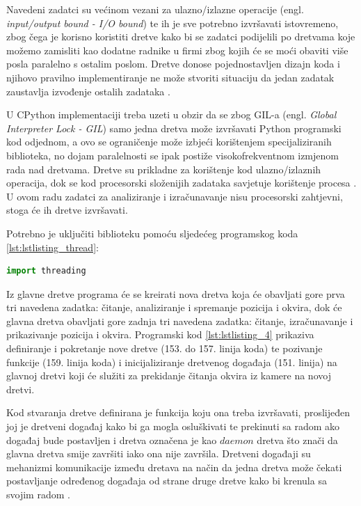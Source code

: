 \documentclass{foi}
\begin{document}
\justifying

Navedeni zadatci su većinom vezani za ulazno/izlazne operacije (engl. \emph{input/output bound - I/O bound}) te ih je sve potrebno izvršavati istovremeno, zbog čega je korisno koristiti dretve kako bi se zadatci podijelili po dretvama koje možemo zamisliti kao dodatne radnike u firmi zbog kojih će se moći obaviti više posla paralelno s ostalim poslom. Dretve donose pojednostavljen dizajn koda i njihovo pravilno implementiranje ne može stvoriti situaciju da jedan zadatak zaustavlja izvođenje ostalih zadataka \cite{AndersonJim}.

U CPython implementaciji treba uzeti u obzir da se zbog GIL-a (engl. \emph{Global Interpreter Lock - GIL}) samo jedna dretva može izvršavati Python programski kod odjednom, a ovo se ograničenje može izbjeći korištenjem specijaliziranih biblioteka, no dojam paralelnosti se ipak postiže visokofrekventnom izmjenom rada nad dretvama. Dretve su prikladne za korištenje kod ulazno/izlaznih operacija, dok se kod procesorski složenijih zadataka savjetuje korištenje procesa \cite{PythonSoftwareFoundation2}. U ovom radu zadatci za analiziranje i izračunavanje nisu procesorski zahtjevni, stoga će ih dretve izvršavati.

\flushleft Potrebno je uključiti biblioteku pomoću sljedećeg programskog koda \ref{lst:lstlisting_thread}:
\begin{lstlisting}[language=Python, label={lst:lstlisting_thread}, firstnumber=2, style=colored, caption=Uključivanje biblioteke $threading$]
import threading
\end{lstlisting}

\justifying

Iz glavne dretve programa će se kreirati nova dretva koja će obavljati gore prva tri navedena zadatka: čitanje, analiziranje i spremanje pozicija i okvira, dok će glavna dretva obavljati gore zadnja tri navedena zadatka: čitanje, izračunavanje i prikazivanje pozicija i okvira. Programski kod \ref{lst:lstlisting_4} prikaziva definiranje i pokretanje nove dretve (153. do 157. linija koda) te pozivanje funkcije (159. linija koda) i inicijaliziranje dretvenog događaja (151. linija) na glavnoj dretvi koji će služiti za prekidanje čitanja okvira iz kamere na novoj dretvi.

Kod stvaranja dretve definirana je funkcija koju ona treba izvršavati, proslijeđen joj je dretveni događaj kako bi ga mogla osluškivati te prekinuti sa radom ako događaj bude postavljen i dretva označena je kao $daemon$ dretva što znači da glavna dretva smije završiti iako ona nije završila. Dretveni događaji su mehanizmi komunikacije između dretava na način da jedna dretva može čekati postavljanje određenog događaja od strane druge dretve kako bi krenula sa svojim radom \cite{PythonSoftwareFoundation2}.
\end{document}
